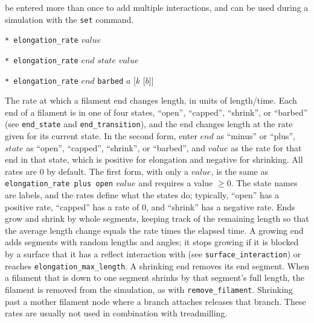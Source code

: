 \documentclass {scrbook}
\newcommand {\ttt} {\texttt}
\begin{document}
\begin{description}
be entered more than once to add multiple interactions, and can be used during a simulation with the \ttt{set} command.

\item{\ttt{* elongation\_rate} $value$} %
\item{\ttt{* elongation\_rate} $end$ $state$ $value$}
\item{\ttt{* elongation\_rate} $end$ \ttt{barbed} $a$ [$k$ [$b$]]}

The rate at which a filament end changes length, in units of length/time. Each end of a filament is in one of four states, ``open'', ``capped'', ``shrink'', or ``barbed'' (see \ttt{end\_state} and \ttt{end\_transition}), and the end changes length at the rate given for its current state. In the second form, enter $end$ as ``minus'' or ``plus'', $state$ as ``open'', ``capped'', ``shrink'', or ``barbed'', and $value$ as the rate for that end in that state, which is positive for elongation and negative for shrinking. All rates are 0 by default. The first form, with only a $value$, is the same as \ttt{elongation\_rate plus open} $value$ and requires a value $\geq 0$. The state names are labels, and the rates define what the states do; typically, ``open'' has a positive rate, ``capped'' has a rate of 0, and ``shrink'' has a negative rate. Ends grow and shrink by whole segments, keeping track of the remaining length so that the average length change equals the rate times the elapsed time. A growing end adds segments with random lengths and angles; it stops growing if it is blocked by a surface that it has a reflect interaction with (see \ttt{surface\_interaction}) or reaches \ttt{elongation\_max\_length}. A shrinking end removes its end segment. When a filament that is down to one segment shrinks by that segment's full length, the filament is removed from the simulation, as with \ttt{remove\_filament}. Shrinking past a mother filament node where a branch attaches releases that branch. These rates are usually not used in combination with treadmilling.


\end{description}
\end{document}
